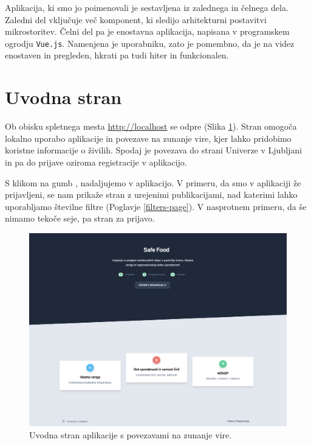 \documentclass[a4paper, 12pt]{book}
\begin{document}
Aplikacija, ki smo jo poimenovali  je sestavljena iz zalednega in čelnega dela. Zaledni del vključuje več komponent, ki sledijo arhitekturni postavitvi mikrostoritev. Čelni del pa je enostavna aplikacija, napisana v programskem ogrodju \verb=Vue.js=. Namenjena je uporabniku, zato je pomembno, da je na videz enostaven in pregleden, hkrati pa tudi hiter in funkcionalen. 


\section{Uvodna stran}
\label{landing-page}
Ob obisku spletnega mesta \url{http://localhost} se odpre  (Slika \ref{landing-page}). Stran omogoča lokalno uporabo aplikacije in povezave na zunanje vire, kjer lahko pridobimo koristne informacije o živilih. Spodaj je povezava do strani Univerze v Ljubljani in pa do prijave oziroma registracije v aplikacijo.

S klikom na gumb , nadaljujemo v aplikacijo. V primeru, da smo v aplikaciji že prijavljeni, se nam prikaže stran z urejenimi publikacijami, nad katerimi lahko uporabljamo številne filtre (Poglavje \ref{filters-page}). V nasprotnem primeru, da še nimamo tekoče seje, pa stran za prijavo.

\begin{figure}[h]
\begin{center}
\includegraphics[width=1\textwidth]{slike/landing-page.png}
\end{center}
\caption{ Uvodna stran aplikacije s povezavami na zunanje vire. }
\label{landing-page}
\end{figure}
\end{document}
